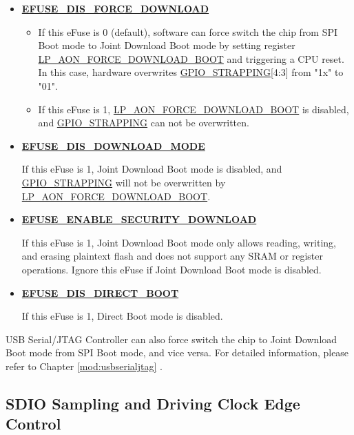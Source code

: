 \documentclass[main\_\_EN.tex]{subfiles}
\begin{document}
\begin{itemize}
    \item \hyperref[fielddesc:EFUSEDISFORCEDOWNLOAD]{\textbf{EFUSE\_DIS\_FORCE\_DOWNLOAD}}
    \begin{itemize}
    \item If this eFuse is 0 (default), software can force switch the chip from SPI Boot mode to Joint Download Boot mode by setting register \hyperref[fielddesc:LPAONFORCEDOWNLOADBOOT]{LP\_AON\_FORCE\_DOWNLOAD\_BOOT} and triggering a CPU reset. In this case, hardware overwrites \hyperref[fielddesc:GPIOSTRAPPING]{GPIO\_STRAPPING}[4:3] from "1x" to "01".

    \item If this eFuse is 1, \hyperref[fielddesc:LPAONFORCEDOWNLOADBOOT]{LP\_AON\_FORCE\_DOWNLOAD\_BOOT} is disabled, and \hyperref[fielddesc:GPIOSTRAPPING]{GPIO\_STRAPPING} can not be overwritten.
    \end{itemize}

    \item \hyperref[fielddesc:EFUSEDISDOWNLOADMODE]{\textbf{EFUSE\_DIS\_DOWNLOAD\_MODE}}

    If this eFuse is 1, Joint Download Boot mode is disabled, and \hyperref[fielddesc:GPIOSTRAPPING]{GPIO\_STRAPPING} will not be overwritten by \hyperref[fielddesc:LPAONFORCEDOWNLOADBOOT]{LP\_AON\_FORCE\_DOWNLOAD\_BOOT}.

    \item \hyperref[fielddesc:EFUSEENABLESECURITYDOWNLOAD]{\textbf{EFUSE\_ENABLE\_SECURITY\_DOWNLOAD}}

    If this eFuse is 1, Joint Download Boot mode only allows reading, writing, and erasing plaintext flash and does not support any SRAM or register operations. Ignore this eFuse if Joint Download Boot mode is disabled.

    \item \hyperref[fielddesc:EFUSEDISDIRECTBOOT]{\textbf{EFUSE\_DIS\_DIRECT\_BOOT}}

    If this eFuse is 1, Direct Boot mode is disabled.
\end{itemize}

USB Serial/JTAG Controller can also force switch the chip to Joint Download Boot mode from SPI Boot mode, and vice versa. For detailed information, please refer to Chapter \ref{mod:usbserialjtag} \textit{}.

\subsection{SDIO Sampling and Driving Clock Edge Control}
\end{document}
